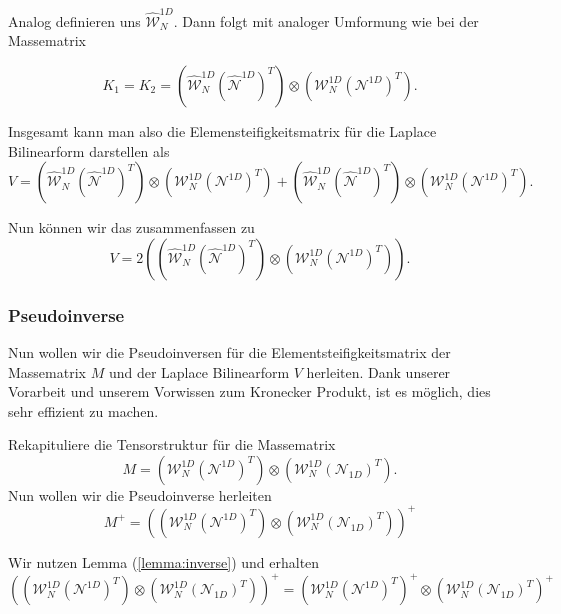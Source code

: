 Analog definieren uns $\widehat{\mathcal{W}}^{1D}_N$.
Dann folgt mit analoger Umformung wie bei der Massematrix

\begin{equation}
K_1 = K_2 = (\widehat{\mathcal{W}}_N^{1D} (\widehat{\mathcal{N}}^{1D})^T) \otimes (\mathcal{W}_N^{1D} (\mathcal{N}^{1D})^T).
\end{equation}


Insgesamt kann man also die Elemensteifigkeitsmatrix für die Laplace Bilinearform darstellen als
\begin{equation}
V =(\widehat{\mathcal{W}}_N^{1D} (\widehat{\mathcal{N}}^{1D})^T) \otimes (\mathcal{W}_N^{1D} (\mathcal{N}^{1D})^T) + (\widehat{\mathcal{W}}_N^{1D} (\widehat{\mathcal{N}}^{1D})^T) \otimes (\mathcal{W}_N^{1D} (\mathcal{N}^{1D})^T).
\end{equation}

Nun können wir das zusammenfassen zu 
\begin{equation}
V = 2 ((\widehat{\mathcal{W}}_N^{1D} (\widehat{\mathcal{N}}^{1D})^T) \otimes (\mathcal{W}_N^{1D} (\mathcal{N}^{1D})^T)).
\end{equation}


\subsubsection{Pseudoinverse}

Nun wollen wir die Pseudoinversen für die Elementsteifigkeitsmatrix der Massematrix $M$ und der Laplace Bilinearform $V$ herleiten. Dank unserer Vorarbeit und unserem Vorwissen zum Kronecker Produkt, ist es möglich, dies sehr effizient zu machen.

Rekapituliere die Tensorstruktur für die Massematrix
\begin{equation}
M =  (\mathcal{W}_N^{1D} (\mathcal{N}^{1D})^T) \otimes (\mathcal{W}_N^{1D} (\mathcal{N}_{1D})^T).
\end{equation}
Nun wollen wir die Pseudoinverse herleiten
\begin{equation}
M^+=  ((\mathcal{W}_N^{1D} (\mathcal{N}^{1D})^T) \otimes (\mathcal{W}_N^{1D} (\mathcal{N}_{1D})^T))^+
\end{equation}

Wir nutzen Lemma (\ref{lemma:inverse}) und erhalten
\begin{equation}
((\mathcal{W}_N^{1D} (\mathcal{N}^{1D})^T) \otimes (\mathcal{W}_N^{1D} (\mathcal{N}_{1D})^T))^+ =  (\mathcal{W}_N^{1D} (\mathcal{N}^{1D})^T)^+ \otimes (\mathcal{W}_N^{1D} (\mathcal{N}_{1D})^T)^+
\end{equation}

